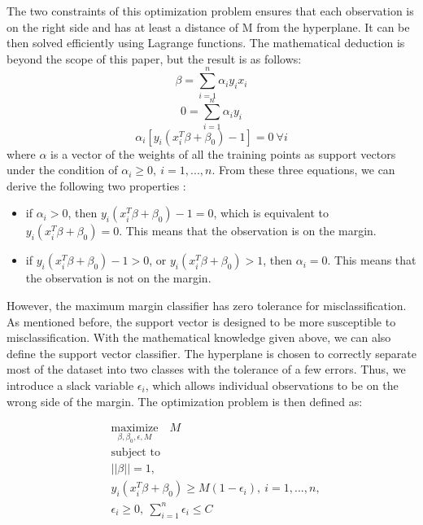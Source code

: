 The two constraints of this optimization problem ensures that each observation is on the right side
and has at least a distance of M from the hyperplane. It can be then solved efficiently using
Lagrange functions. The mathematical deduction is beyond the scope of this paper, 
but the result is as follows:
\begin{equation}
    \beta = \sum_{i=1}^n \alpha_i y_i x_i
\end{equation}
\begin{equation}
    0 = \sum_{i=1}^n \alpha_i y_i
\end{equation}
\begin{equation}
    \alpha_i[y_i(x_i^T\beta + \beta_0) - 1] = 0\ \forall i
\end{equation}
where $\alpha$ is a vector of the weights of all the training points as support vectors
under the condition of $\alpha_i \geq 0,\ i = 1, ..., n$. From these three equations, we can
derive the following two properties \cite{Elements4}:
\begin{itemize}
    \item if $\alpha_i > 0$, then $y_i(x_i^T\beta + \beta_0) - 1 = 0$, which is equivalent to
    $y_i(x_i^T\beta + \beta_0) = 0$. This means that the observation is on the margin.
    \item if $y_i(x_i^T\beta + \beta_0) - 1 > 0$, or $y_i(x_i^T\beta + \beta_0) > 1$, then
    $\alpha_i = 0$. This means that the observation is not on the margin.
  \end{itemize}




However, the maximum margin classifier has zero tolerance for misclassification. As mentioned before,
the support vector is designed to be more susceptible to misclassification. With the mathematical knowledge
given above, we can also define the support vector classifier. The hyperplane
is chosen to correctly separate most of the dataset into two classes with the tolerance of a few errors.
Thus, we introduce a slack variable $\epsilon_i$, which allows individual observations to be on the wrong side 
of the margin.
The optimization problem is then defined as\cite{R9}:

\begin{equation}
    \begin{aligned}
      & \underset{\textstyle {\beta, \beta_0, \epsilon, M}}{\text{maximize}} \quad
        M \\
      & \text{subject to} \\
      & ||\beta|| = 1, \\
      & y_i(x_i^T \beta + \beta_0) \geq M(1-\epsilon_i),\ i = 1, ..., n, \\
      & \epsilon_i \geq 0, \ \sum_{i=1}^n \epsilon_i \leq C
    \end{aligned}
\end{equation}

